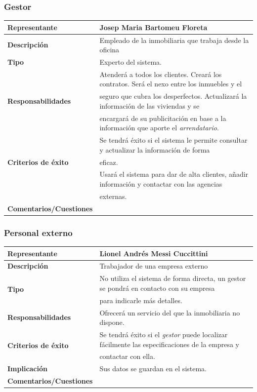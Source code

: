 \documentclass[10pt,a4paper]{article}
\begin{document}
{\subsubsection*{Gestor}
\begin{tabular}{|l|l|}
\hline
{\small\textbf{Representante}} & Josep Maria Bartomeu Floreta \\ \hline
{\small\textbf{Descripción}} & Empleado de la inmobiliaria que trabaja desde la oficina \\ \hline
{\small\textbf{Tipo}} & Experto del sistema. \\ \hline
\multirow{3}{*}{\small\textbf{Responsabilidades}} & Atenderá a todos los clientes. Creará los contratos. Será el nexo entre los inmuebles y el\\
 & seguro que cubra los desperfectos. Actualizará la información de las viviendas y se\\
 & encargará de su publicitación en base a la información que aporte el \textit{arrendatario}. \\ \hline
\multirow{3}{*}{{\small\textbf{Criterios de éxito}}} & Se tendrá éxito si el sistema le permite consultar y actualizar la información de forma\\
 & eficaz. \\ \hline
\multirow{2}{*}{\small\textbf{Implicación}} & Usará el sistema para dar de alta clientes, añadir información y contactar con las agencias\\
 & externas. \\ \hline
{\small\textbf{Comentarios/Cuestiones}} & \\ \hline
\end{tabular}
\subsubsection*{Personal externo}
\begin{tabular}{|l|l|}
\hline
{\small\textbf{Representante}} & Lionel Andrés Messi Cuccittini \\ \hline
{\small\textbf{Descripción}} & Trabajador de una empresa externo \\ \hline
\multirow{2}{*}{\small\textbf{Tipo}} & No utiliza el sistema de forma directa, un gestor se pondrá en contacto con su empresa\\
 & para indicarle más detalles. \\ \hline
{\small\textbf{Responsabilidades}} & Ofrecerá un servicio del que la inmobiliaria no dispone. \\ \hline
\multirow{2}{*}{\small\textbf{Criterios de éxito}} & Se tendrá éxito si el \textit{gestor} puede localizar fácilmente las especificaciones de la empresa y\\
 & contactar con ella. \\ \hline
{\small\textbf{Implicación}} & Sus datos se guardan en el sistema. \\ \hline
{\small\textbf{Comentarios/Cuestiones}} & \\ \hline
\end{tabular}}
\end{document}
